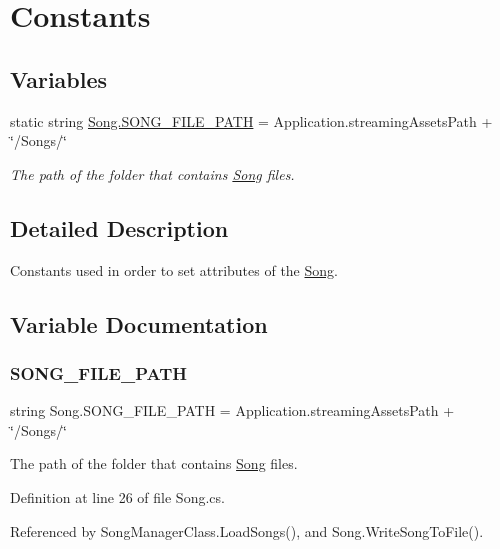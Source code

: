 \hypertarget{group___song_const}{}\section{Constants}
\label{group___song_const}
\subsection*{Variables}
\begin{DoxyCompactItemize}
\item 
static string \hyperlink{group___song_const_ga95247572cf734f9e8b35973de4eeb1a4}{Song.\+S\+O\+N\+G\+\_\+\+F\+I\+L\+E\+\_\+\+P\+A\+TH} = Application.\+streaming\+Assets\+Path + \char`\"{}/Songs/\char`\"{}
\begin{DoxyCompactList}\small\item\em The path of the folder that contains \hyperlink{class_song}{Song} files. \end{DoxyCompactList}\end{DoxyCompactItemize}


\subsection{Detailed Description}
Constants used in order to set attributes of the \hyperlink{class_song}{Song}. 

\subsection{Variable Documentation}
\mbox{\label{group___song_const_ga95247572cf734f9e8b35973de4eeb1a4}} 
\subsubsection{\texorpdfstring{S\+O\+N\+G\+\_\+\+F\+I\+L\+E\+\_\+\+P\+A\+TH}{SONG\_FILE\_PATH}}
{\footnotesize\ttfamily string Song.\+S\+O\+N\+G\+\_\+\+F\+I\+L\+E\+\_\+\+P\+A\+TH = Application.\+streaming\+Assets\+Path + \char`\"{}/Songs/\char`\"{}\hspace{0.3cm}{\ttfamily [static]}}



The path of the folder that contains \hyperlink{class_song}{Song} files. 



Definition at line 26 of file Song.\+cs.



Referenced by Song\+Manager\+Class.\+Load\+Songs(), and Song.\+Write\+Song\+To\+File().

